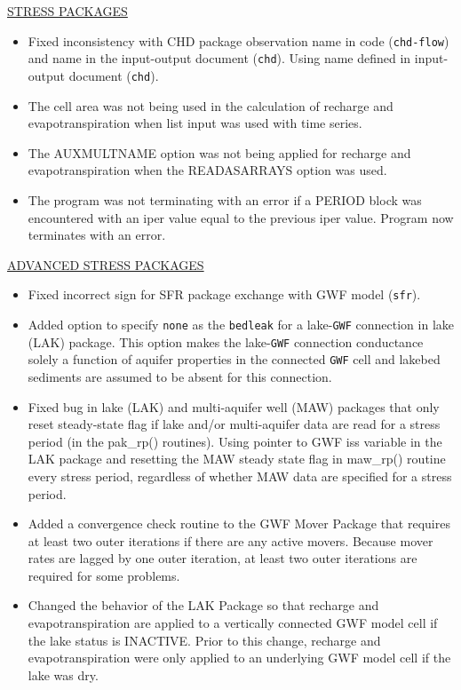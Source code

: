 \begin{itemize}
	\underline{STRESS PACKAGES}
	\begin{itemize}
		\item Fixed inconsistency with CHD package observation name in code (\texttt{chd-flow}) and name in the input-output document (\texttt{chd}). Using name defined in input-output document (\texttt{chd}).
		\item The cell area was not being used in the calculation of recharge and evapotranspiration when list input was used with time series.
		\item The AUXMULTNAME option was not being applied for recharge and evapotranspiration when the READASARRAYS option was used.
		\item The program was not terminating with an error if a PERIOD block was encountered with an iper value equal to the previous iper value.  Program now terminates with an error.
	\end{itemize}
	
	\underline{ADVANCED STRESS PACKAGES}
	\begin{itemize}
		\item Fixed incorrect sign for SFR package exchange with GWF model (\texttt{sfr}).
		\item Added option to specify \texttt{none} as the \texttt{bedleak} for a lake-\texttt{GWF} connection in lake (LAK) package. This option makes the lake-\texttt{GWF} connection conductance solely a function of aquifer properties in the connected \texttt{GWF} cell and lakebed sediments are assumed to be absent for this connection.
		\item Fixed bug in lake (LAK) and multi-aquifer well (MAW) packages that only reset steady-state flag if lake and/or multi-aquifer data are read for a stress period (in the pak\_rp() routines). Using pointer to GWF iss variable in the LAK package and resetting the MAW steady state flag in maw\_rp() routine every stress period, regardless of whether MAW data are specified for a stress period.
		\item Added a convergence check routine to the GWF Mover Package that requires at least two outer iterations if there are any active movers.  Because mover rates are lagged by one outer iteration, at least two outer iterations are required for some problems.
		\item Changed the behavior of the LAK Package so that recharge and evapotranspiration are applied to a vertically connected GWF model cell if the lake status is INACTIVE.  Prior to this change, recharge and evapotranspiration were only applied to an underlying GWF model cell if the lake was dry.
	\end{itemize}
	

\end{itemize}
